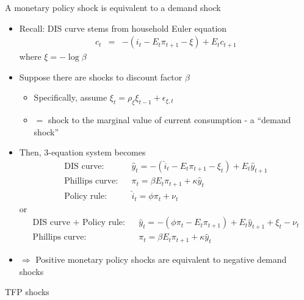 \documentclass[9pt,xcolor={dvipsnames}]{beamer}
\newcommand{\bit}{\begin{itemize}}
\newcommand{\eit}{\end{itemize}}
\begin{document}
\begin{frame}{A monetary policy shock is equivalent to a demand shock}

\bit
\setlength\itemsep{1em}
\item Recall: DIS curve stems from household Euler equation
\begin{eqnarray}
c_t &=& - (i_t-E_t \pi_{t+1}-\xi) + E_t c_{t+1} \nonumber
\end{eqnarray}
where $\xi = -\log \beta$

\item Suppose there are shocks to discount factor $\beta$ 
\bit
\setlength\itemsep{0.5em}
\item Specifically, assume $\xi_t = \rho_{\xi} \xi_{t-1} + \epsilon_{\xi, t}$

\item $=$ shock to the marginal value of current consumption - a ``demand shock''
\eit

\item Then, 3-equation system becomes
\begin{eqnarray}
\text{DIS curve:} && \hat y_t = - (\hat i_t-E_t \pi_{t+1} - \xi_t) + E_t \hat y_{t+1} \nonumber \\
\text{Phillips curve:} && \pi_t = \beta E_t \pi_{t+1} + \kappa \hat y_t \nonumber \\
\text{Policy rule:} && \hat i_t = \phi \pi_t + \nu_t \nonumber 
\end{eqnarray}
or
\begin{eqnarray}
\text{DIS curve + Policy rule:} && \hat y_t = - (\phi \pi_t-E_t \pi_{t+1}) + E_t \hat y_{t+1} + \xi_t - \nu_t \nonumber \\
\text{Phillips curve:} && \pi_t = \beta E_t \pi_{t+1} + \kappa \hat y_t \nonumber 
\end{eqnarray}

\item $\Rightarrow$ Positive monetary policy shocks are equivalent to negative demand shocks

\eit


\end{frame}


\begin{frame}

\begin{center}
	\huge TFP shocks \normalfont
\end{center}

\end{frame}
\end{document}
